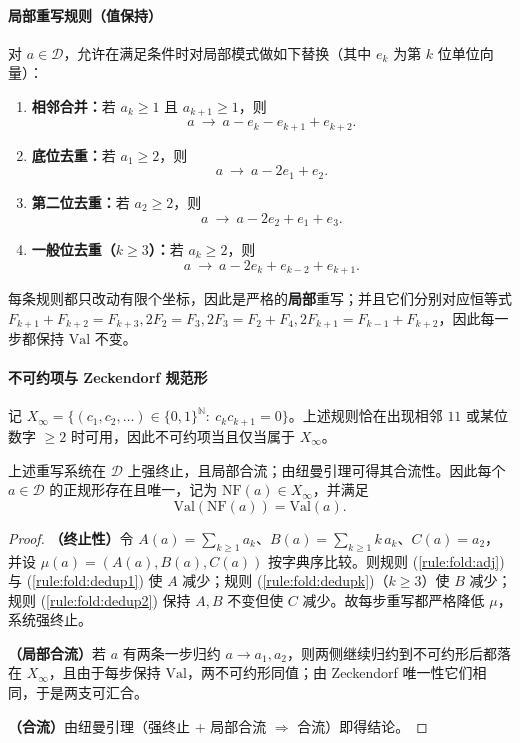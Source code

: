 \paragraph{局部重写规则（值保持）}
对 $a\in\mathcal{D}$，允许在满足条件时对局部模式做如下替换（其中 $e_k$ 为第 $k$ 位单位向量）：
\begin{enumerate}
  \renewcommand{\theenumi}{R\arabic{enumi}}
  \renewcommand{\labelenumi}{(\theenumi)}
  \item \label{rule:fold:adj}\textbf{相邻合并：}若 $a_k\ge 1$ 且 $a_{k+1}\ge 1$，则
  \[
  a\ \to\ a-e_k-e_{k+1}+e_{k+2}.
  \]
  \item \label{rule:fold:dedup1}\textbf{底位去重：}若 $a_1\ge 2$，则
  \[
  a\ \to\ a-2e_1+e_2.
  \]
  \item \label{rule:fold:dedup2}\textbf{第二位去重：}若 $a_2\ge 2$，则
  \[
  a\ \to\ a-2e_2+e_1+e_3.
  \]
  \item \label{rule:fold:dedupk}\textbf{一般位去重（$k\ge 3$）：}若 $a_k\ge 2$，则
  \[
  a\ \to\ a-2e_k+e_{k-2}+e_{k+1}.
  \]
\end{enumerate}
每条规则都只改动有限个坐标，因此是严格的\textbf{局部}重写；并且它们分别对应恒等式
\(
F_{k+1}+F_{k+2}=F_{k+3},
2F_2=F_3,
2F_3=F_2+F_4,
2F_{k+1}=F_{k-1}+F_{k+2}
\)，因此每一步都保持 $\mathrm{Val}$ 不变。

\paragraph{不可约项与 Zeckendorf 规范形}
记 $X_\infty=\{(c_1,c_2,\dots)\in\{0,1\}^{\mathbb{N}}:\ c_kc_{k+1}=0\}$。上述规则恰在出现相邻 $11$ 或某位数字 $\ge 2$ 时可用，因此不可约项当且仅当属于 $X_\infty$。

\begin{proposition}\label{prop:fold-rewrite-newman}
上述重写系统在 $\mathcal{D}$ 上强终止，且局部合流；由纽曼引理可得其合流性。因此每个 $a\in\mathcal{D}$ 的正规形存在且唯一，记为 $\mathrm{NF}(a)\in X_\infty$，并满足
\[
\mathrm{Val}(\mathrm{NF}(a))=\mathrm{Val}(a).
\]
\end{proposition}

\begin{proof}
\textbf{（终止性）}令 $A(a)=\sum_{k\ge 1} a_k$、$B(a)=\sum_{k\ge 1} k\,a_k$、$C(a)=a_2$，并设 $\mu(a)=(A(a),B(a),C(a))$ 按字典序比较。则规则 (\ref{rule:fold:adj}) 与 (\ref{rule:fold:dedup1}) 使 $A$ 减少；规则 (\ref{rule:fold:dedupk})（$k\ge 3$）使 $B$ 减少；规则 (\ref{rule:fold:dedup2}) 保持 $A,B$ 不变但使 $C$ 减少。故每步重写都严格降低 $\mu$，系统强终止。

\textbf{（局部合流）}若 $a$ 有两条一步归约 $a\to a_1,a_2$，则两侧继续归约到不可约形后都落在 $X_\infty$，且由于每步保持 $\mathrm{Val}$，两不可约形同值；由 Zeckendorf 唯一性它们相同，于是两支可汇合。

\textbf{（合流）}由纽曼引理（强终止 + 局部合流 $\Rightarrow$ 合流）即得结论。
\end{proof}

